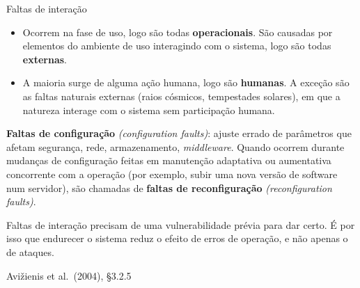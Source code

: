\documentclass{beamer}
\newcommand{\en}[1]{{\color{depCinza}\textit{#1}}}
\newcommand{\sect}[1]{\par\smallskip\hfill{\tiny\color{black!55}Avi\v{z}ienis et al.\ (2004), #1}}
\begin{document}
\begin{frame}{Faltas de intera\c{c}\~ao}
    \footnotesize
    \begin{itemize}
        \item Ocorrem na fase de uso, logo s\~ao todas \textbf{operacionais}. S\~ao causadas por elementos do ambiente de uso interagindo com o sistema, logo s\~ao todas \textbf{externas}.
        \item A maioria surge de alguma a\c{c}\~ao humana, logo s\~ao \textbf{humanas}. A exce\c{c}\~ao s\~ao as faltas naturais externas (raios c\'osmicos, tempestades solares), em que a natureza interage com o sistema sem participa\c{c}\~ao humana.
    \end{itemize}
    \medskip
    \begin{defi}
        \scriptsize
        \textbf{Faltas de configura\c{c}\~ao} \en{(configuration faults)}: ajuste errado de par\^ametros que afetam seguran\c{c}a, rede, armazenamento, \textit{middleware}. Quando ocorrem durante mudan\c{c}as de configura\c{c}\~ao feitas em manuten\c{c}\~ao adaptativa ou aumentativa concorrente com a opera\c{c}\~ao (por exemplo, subir uma nova vers\~ao de software num servidor), s\~ao chamadas de \textbf{faltas de reconfigura\c{c}\~ao} \en{(reconfiguration faults)}.
    \end{defi}
    \medskip
    \begin{ancora}
        \footnotesize
        Faltas de intera\c{c}\~ao precisam de uma vulnerabilidade pr\'evia para dar certo. \'E por isso que endurecer o sistema reduz o efeito de erros de opera\c{c}\~ao, e n\~ao apenas o de ataques.
    \end{ancora}
    \sect{\S3.2.5}
\end{frame}
\end{document}
